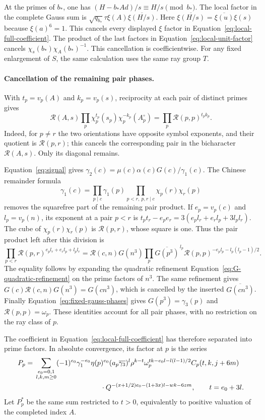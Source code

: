 \documentclass[11pt,a4paper]{article}
\numberwithin{equation}{section}
\numberwithin{figure}{section}
\theoremstyle{definition}
\theoremstyle{remark}
\begin{document}
At the primes of $b_*$, one has
$(H-b_*Ad)/s\equiv H/s\pmod {b_*}$.  The local factor in the
complete Gauss sum is
$\sqrt{q_{b_*}}\tau\xi(A)\overline{\xi(H/s)}$.
Here $\overline{\xi(H/s)}=\overline{\xi(u)}\xi(s)$ because
$\xi(a)^6=1$.  This cancels every displayed $\xi$ factor in
Equation~\eqref{eq:local-full-coefficient}.  The product of the last
factors in Equation~\eqref{eq:local-unit-factor} cancels
$\chi_s(b_*)\chi_A(b_*)^{-1}$.  This cancellation is coefficientwise.
For any fixed enlargement of $S$, the same calculation uses the same
ray group $T$.

\paragraph{Cancellation of the remaining pair phases.}
With $t_p=v_p(A)$ and $k_p=v_p(s)$, reciprocity at each pair of
distinct primes gives
\[
 \mathcal R(A,s)\prod_p
       \chi_p^{t_p}(s_p)\chi_p^{-k_p}(A_p^\circ)
       =\prod_p\mathcal R(p,p)^{t_pk_p}.
\]
Indeed, for $p\ne r$ the two orientations have opposite symbol
exponents, and their quotient is $\mathcal R(p,r)$; this cancels
the corresponding pair in the bicharacter $\mathcal R(A,s)$.
Only its diagonal remains.

Equation~\eqref{eq:signal} gives
$\gamma_2(c)=\mu(c)\alpha(c)G(c)/\gamma_1(c)$.
The Chinese remainder formula
\[
 \gamma_1(c)=\prod_{p\mid c}\gamma_1(p)
             \prod_{p<r,\ p,r\mid c}\chi_p(r)\chi_r(p)
\]
removes the squarefree part of the remaining pair product.  If
$e_p=v_p(c)$ and $l_p=v_p(n)$, its exponent at a pair $p<r$ is
$t_pt_r-e_pe_r=3(e_pl_r+e_rl_p+3l_pl_r)$.  The cube of
$\chi_p(r)\chi_r(p)$ is $\mathcal R(p,r)$, whose square is one.
Thus the pair product left after this division is
\[
 \prod_{p<r}\mathcal R(p,r)^{e_pl_r+e_rl_p+l_pl_r}
 =\mathcal R(c,n)G(n^3)
   \prod_p\overline{G(p^3)}^{\,l_p}
            \mathcal R(p,p)^{-e_pl_p-l_p(l_p-1)/2}.
\]
The equality follows by expanding the quadratic refinement
Equation~\eqref{eq:G-quadratic-refinement} on the prime factors of
$n^3$.  The same refinement gives
$G(c)\mathcal R(c,n)G(n^3)=G(cn^3)$, which is cancelled by the
inserted $\overline{G(cn^3)}$.  Finally
Equation~\eqref{eq:fixed-gauss-phases} gives
$G(p^3)=\gamma_3(p)$ and $\mathcal R(p,p)=\omega_p$.
These identities account for all pair phases, with no restriction
on the ray class of $p$.

The coefficient in Equation~\eqref{eq:local-full-coefficient}
has therefore separated into prime factors.  In absolute convergence,
its factor at $p$ is the series
\begin{equation}\label{eq:local-P}
\begin{aligned}
 P_p={}&\sum_{\substack{e_0=0,1\\l,k,m\ge0}}
 (-1)^{e_0}\gamma_1^{-e_0}\eta(p)^{e_0}
 (a_p\overline{\gamma_3})^l\rho^{k-t}
 \omega_p^{tk-e_0l-l(l-1)/2}C_p(t,k,j+6m)\\
 &\hspace{33mm}\cdot
 Q^{-(x+1/2)e_0-(1+3x)l-wk-6zm},\qquad t=e_0+3l.
\end{aligned}
\end{equation}
Let $P_p^*$ be the same sum restricted to $t>0$, equivalently to
positive valuation of the completed index $A$.
\end{document}
